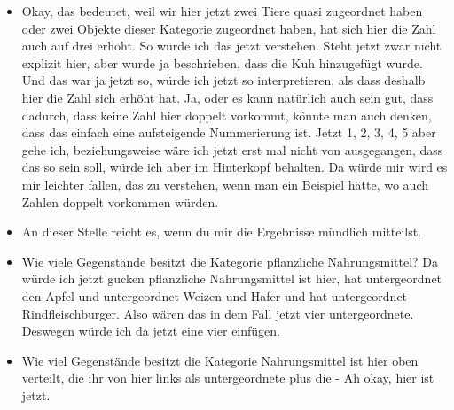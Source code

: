 {\begin{itemize}[]
              Genau wie die hier schon schreiben.
              Ich meine, es ist ja ein Tutorial, das erklärt mir das ja auch gerade zum ersten Mal.
              Deswegen kann ich nicht viel mehr dazu sagen als das, was ich hier selber lese.
              Aber es werden halt Relationen hergestellt und ist jetzt halt mit dem Tier verknüpft, weil das hier quasi in diesem Kreis integriert ist und hat dann halt durch diese Relation eine Verknüpfung zum Säugetier und wurde deswegen hier diese Anzahl auf zwei erhöht.
              Also man kann Verknüpfungen auf unterschiedliche Arten herstellen.
              Eine Kategorie, welche sich unter Säugetiere einordnen lässt.
              Ich denke Fleischfressern. Ah okay, und das wird auch scheinbar so weitergereicht.
              Also oben ist jetzt hat sich jetzt die 2 in eine 3 verwandelt, obwohl es keine direkte Relation war, sondern eine indirekte Relation.
        \item {} Okay, das bedeutet, weil wir hier jetzt zwei Tiere quasi zugeordnet haben oder zwei Objekte dieser Kategorie zugeordnet haben, hat sich hier die Zahl auch auf drei erhöht.
              So würde ich das jetzt verstehen.
              Steht jetzt zwar nicht explizit hier, aber wurde ja beschrieben, dass die Kuh hinzugefügt wurde.
              Und das war ja jetzt so, würde ich jetzt so interpretieren, als dass deshalb hier die Zahl sich erhöht hat.
              Ja, oder es kann natürlich auch sein gut, dass dadurch, dass keine Zahl hier doppelt vorkommt, könnte man auch denken, dass das einfach eine aufsteigende Nummerierung ist.
              Jetzt 1, 2, 3, 4, 5 aber gehe ich, beziehungsweise wäre ich jetzt erst mal nicht von ausgegangen, dass das so sein soll, würde ich aber im Hinterkopf behalten.
              Da würde mir wird es mir leichter fallen, das zu verstehen, wenn man ein Beispiel hätte, wo auch Zahlen doppelt vorkommen würden.
        \item {} An dieser Stelle reicht es, wenn du mir die Ergebnisse mündlich mitteilst.
        \item {} Wie viele Gegenstände besitzt die Kategorie pflanzliche Nahrungsmittel? Da würde ich jetzt gucken pflanzliche Nahrungsmittel ist hier, hat untergeordnet den Apfel und untergeordnet Weizen und Hafer und hat untergeordnet Rindfleischburger.
              Also wären das in dem Fall jetzt vier untergeordnete.
              Deswegen würde ich da jetzt eine vier einfügen.
        \item {} Wie viel Gegenstände besitzt die Kategorie Nahrungsmittel ist hier oben verteilt, die ihr von hier links als untergeordnete plus die - Ah okay, hier ist jetzt.

\end{itemize}}
